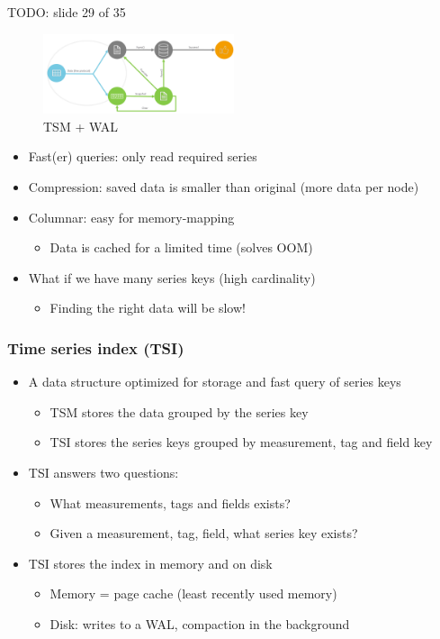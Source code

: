 \documentclass{article}
\begin{document}
TODO: slide 29 of 35

\begin{figure}[H]
    \centering
    \includegraphics[width=0.5\textwidth]{tick-architecture-wal-tsm.png}
    \caption{TSM + WAL}
\end{figure}

\begin{itemize}
    \item Fast(er) queries: only read required series
    \item Compression: saved data is smaller than original (more data per node)
    \item Columnar: easy for memory-mapping
    \begin{itemize}
        \item Data is cached for a limited time (solves OOM)
    \end{itemize}
    \item What if we have many series keys (high cardinality)
    \begin{itemize}
        \item Finding the right data will be slow!
    \end{itemize}
\end{itemize}

\subsubsection{Time series index (TSI)}

\begin{itemize}
    \item A data structure optimized for storage and fast query of series keys
    \begin{itemize}
        \item TSM stores the data grouped by the series key
        \item TSI stores the series keys grouped by measurement, tag and field key
    \end{itemize}
    \item TSI answers two questions:
    \begin{itemize}
        \item What measurements, tags and fields exists?
        \item Given a measurement, tag, field, what series key exists?
    \end{itemize}
    \item TSI stores the index in memory and on disk
    \begin{itemize}
        \item Memory = page cache (least recently used memory)
        \item Disk: writes to a WAL, compaction in the background
    \end{itemize}
\end{itemize}
\end{document}

